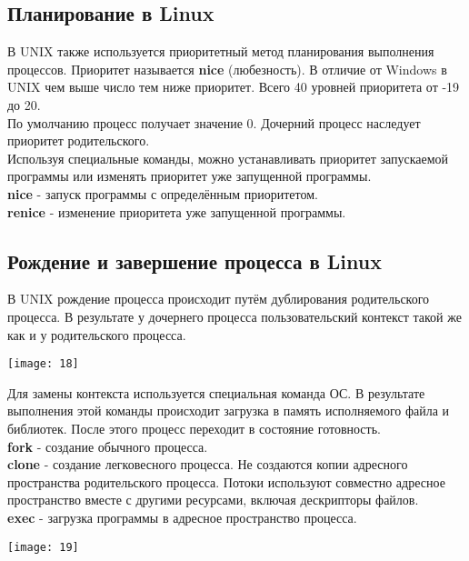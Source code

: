 \documentclass[a4paper]{article}
\begin{document}
\subsection{Планирование в Linux}
В UNIX также используется приоритетный метод планирования выполнения процессов. Приоритет называется \textbf{nice} (любезность). В отличие от Windows в UNIX чем выше число тем ниже приоритет. Всего 40 уровней приоритета от -19 до 20.\\
По умолчанию процесс получает значение 0. Дочерний процесс наследует приоритет родительского.\\
Используя специальные команды, можно устанавливать приоритет запускаемой программы или изменять приоритет уже запущенной программы.\\
\textbf{nice} - запуск программы с определённым приоритетом.\\
\textbf{renice} - изменение приоритета уже запущенной программы.\\ 
\subsection{Рождение и завершение процесса в Linux}
В UNIX рождение процесса происходит путём дублирования родительского процесса. В результате у дочернего процесса пользовательский контекст такой же как и у родительского процесса. 
\begin{center}
	\texttt{[image: 18]}
\end{center}
Для замены контекста используется специальная команда ОС. В результате выполнения этой команды происходит загрузка в память исполняемого файла и библиотек. После этого процесс переходит в состояние готовность.\\
\textbf{fork} - создание обычного процесса.\\
\textbf{clone} - создание легковесного процесса. Не создаются копии адресного пространства родительского процесса. Потоки используют совместно адресное пространство вместе с другими ресурсами, включая дескрипторы файлов.\\
\textbf{exec} - загрузка программы в адресное пространство процесса.\\ 
\begin{center}
	\texttt{[image: 19]}
\end{center}
\end{document}
